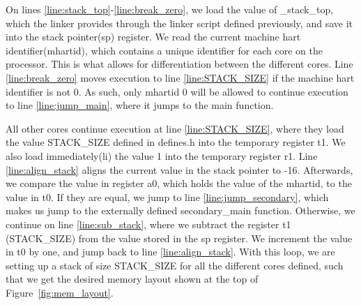 On lines \ref{line:stack_top}-\ref{line:break_zero}, we load the value of
\_stack\_top, which the linker provides through the linker script defined
previously, and save it into the stack pointer(sp) register. We read the current
machine hart identifier(mhartid), which contains a unique identifier for each
core on the processor. This is what allows for differentiation between the
different cores. Line \ref{line:break_zero} moves execution to line
\ref{line:STACK_SIZE} if the machine hart identifier is not 0. As such, only
mhartid 0 will be allowed to continue execution to line \ref{line:jump_main},
where it jumps to the main function.

All other cores continue execution at line \ref{line:STACK_SIZE}, where they
load the value STACK\_SIZE defined in defines.h into the temporary register t1.
We also load immediately(li) the value
1 into the temporary register r1. Line \ref{line:align_stack} aligns the current
value in the stack pointer to -16. Afterwards, we compare the value in
register a0, which holds the value of the mhartid, to the value in t0. If they
are equal, we jump to line \ref{line:jump_secondary}, which makes us jump to
the externally defined secondary\_main function. Otherwise, we continue on
line \ref{line:sub_stack}, where we subtract the register t1 (STACK\_SIZE)
from the value stored in the sp register. We increment the value in t0 by one,
and jump back to line \ref{line:align_stack}. With this loop, we are setting
up a stack of size STACK\_SIZE for all the different cores defined, such that
we get the desired memory layout shown at the top of
Figure~\ref{fig:mem_layout}.

